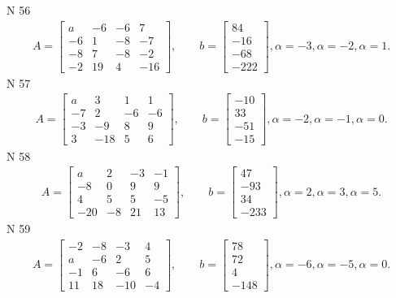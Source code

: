\documentclass[11pt]{report}
\begin{document}
N 56
\begin{align*}
 A = \left[\begin{matrix}a & -6 & -6 & 7\\-6 & 1 & -8 & -7\\-8 & 7 & -8 & -2\\-2 & 19 & 4 & -16\end{matrix}\right],
    \qquad b = \left[\begin{matrix}84\\-16\\-68\\-222\end{matrix}\right], \alpha = -3, \alpha = -2, \alpha = 1. 
 \end{align*}
N 57
\begin{align*}
 A = \left[\begin{matrix}a & 3 & 1 & 1\\-7 & 2 & -6 & -6\\-3 & -9 & 8 & 9\\3 & -18 & 5 & 6\end{matrix}\right],
    \qquad b = \left[\begin{matrix}-10\\33\\-51\\-15\end{matrix}\right], \alpha = -2, \alpha = -1, \alpha = 0. 
 \end{align*}
N 58
\begin{align*}
 A = \left[\begin{matrix}a & 2 & -3 & -1\\-8 & 0 & 9 & 9\\4 & 5 & 5 & -5\\-20 & -8 & 21 & 13\end{matrix}\right],
    \qquad b = \left[\begin{matrix}47\\-93\\34\\-233\end{matrix}\right], \alpha = 2, \alpha = 3, \alpha = 5. 
 \end{align*}
N 59
\begin{align*}
 A = \left[\begin{matrix}-2 & -8 & -3 & 4\\a & -6 & 2 & 5\\-1 & 6 & -6 & 6\\11 & 18 & -10 & -4\end{matrix}\right],
    \qquad b = \left[\begin{matrix}78\\72\\4\\-148\end{matrix}\right], \alpha = -6, \alpha = -5, \alpha = 0. 
 \end{align*}
\end{document}
